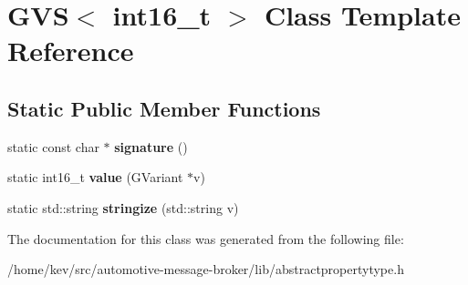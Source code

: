 \hypertarget{classGVS_3_01int16__t_01_4}{\section{G\+V\+S$<$ int16\+\_\+t $>$ Class Template Reference}
\label{classGVS_3_01int16__t_01_4}
}
\subsection*{Static Public Member Functions}
\begin{DoxyCompactItemize}
\item 
\hypertarget{classGVS_3_01int16__t_01_4_a74fd2e54cfeebf2f87376b11a4d7b527}{static const char $\ast$ {\bfseries signature} ()}\label{classGVS_3_01int16__t_01_4_a74fd2e54cfeebf2f87376b11a4d7b527}

\item 
\hypertarget{classGVS_3_01int16__t_01_4_a3b5ee21a1f741c1543bf22738885e460}{static int16\+\_\+t {\bfseries value} (G\+Variant $\ast$v)}\label{classGVS_3_01int16__t_01_4_a3b5ee21a1f741c1543bf22738885e460}

\item 
\hypertarget{classGVS_3_01int16__t_01_4_a8ebde11ede44782a48dc2aecbbb5e3af}{static std\+::string {\bfseries stringize} (std\+::string v)}\label{classGVS_3_01int16__t_01_4_a8ebde11ede44782a48dc2aecbbb5e3af}

\end{DoxyCompactItemize}


The documentation for this class was generated from the following file\+:\begin{DoxyCompactItemize}
\item 
/home/kev/src/automotive-\/message-\/broker/lib/abstractpropertytype.\+h\end{DoxyCompactItemize}
